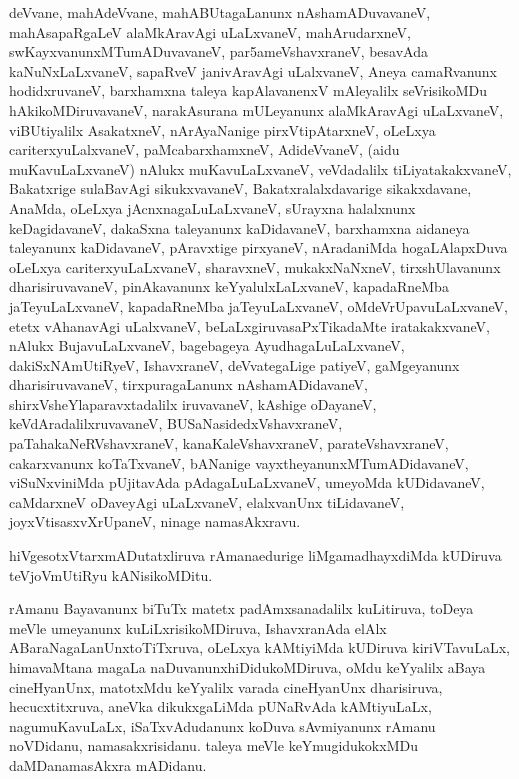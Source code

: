 \documentclass{article}
\begin{document}
\begin{mn}
deVvane,  mahAdeVvane,  mahABUtagaLanunx  nAshamADuvavaneV,  mahAsapaRgaLeV  alaMkAravAgi  uLaLxvaneV,  mahArudarxneV,  
swKayxvanunxMTumADuvavaneV,  par5ameVshavxraneV,  besavAda  kaNuNxLaLxvaneV,  sapaRveV  janivAravAgi  uLalxvaneV,  Aneya  
camaRvanunx  hodidxruvaneV,  barxhamxna  taleya  kapAlavanenxV  mAleyalilx  seVrisikoMDu  hAkikoMDiruvavaneV,  narakAsurana  
mULeyanunx  alaMkAravAgi  uLaLxvaneV,  viBUtiyalilx  AsakatxneV,  nArAyaNanige  pirxVtipAtarxneV,  oLeLxya  cariterxyuLalxvaneV,  
paMcabarxhamxneV,  AdideVvaneV,  (aidu  muKavuLaLxvaneV)  nAlukx  muKavuLaLxvaneV,  veVdadalilx  tiLiyatakakxvaneV,  Bakatxrige  
sulaBavAgi  sikukxvavaneV,  Bakatxralalxdavarige  sikakxdavane,  AnaMda,  oLeLxya  jAcnxnagaLuLaLxvaneV,  sUrayxna  halalxnunx  
keDagidavaneV,  dakaSxna  taleyanunx  kaDidavaneV,  barxhamxna  aidaneya  taleyanunx  kaDidavaneV,  pAravxtige  pirxyaneV,  
nAradaniMda  hogaLAlapxDuva  oLeLxya  cariterxyuLaLxvaneV,  sharavxneV,  mukakxNaNxneV,  tirxshUlavanunx  dharisiruvavaneV,  
pinAkavanunx  keYyalulxLaLxvaneV,  kapadaRneMba  jaTeyuLaLxvaneV,  kapadaRneMba  jaTeyuLaLxvaneV,  oMdeVrUpavuLaLxvaneV,  etetx  
vAhanavAgi  uLalxvaneV,  beLaLxgiruvasaPxTikadaMte  iratakakxvaneV,  nAlukx  BujavuLaLxvaneV,  bagebageya  AyudhagaLuLaLxvaneV,  
dakiSxNAmUtiRyeV,  IshavxraneV,  deVvategaLige  patiyeV,  gaMgeyanunx  dharisiruvavaneV,  tirxpuragaLanunx  nAshamADidavaneV,  
shirxVsheYlaparavxtadalilx  iruvavaneV,  kAshige  oDayaneV,  keVdAradalilxruvavaneV,  BUSaNasidedxVshavxraneV,  paTahakaNeRVshavxraneV,  
kanaKaleVshavxraneV,  parateVshavxraneV,  cakarxvanunx  koTaTxvaneV,  bANanige  vayxtheyanunxMTumADidavaneV,  viSuNxviniMda  pUjitavAda  
pAdagaLuLaLxvaneV,  umeyoMda  kUDidavaneV,  caMdarxneV  oDaveyAgi  uLaLxvaneV,  elalxvanUnx  tiLidavaneV,  joyxVtisasxvXrUpaneV,  ninage  namasAkxravu.
\end{mn}

\begin{mn}
hiVgesotxVtarxmADutatxliruva  rAmanaedurige  liMgamadhayxdiMda  kUDiruva  teVjoVmUtiRyu  kANisikoMDitu.
\end{mn}

\begin{mn}
rAmanu  Bayavanunx  biTuTx  matetx  padAmxsanadalilx  kuLitiruva,  toDeya  meVle  umeyanunx  kuLiLxrisikoMDiruva,  IshavxranAda  
elAlx  ABaraNagaLanUnxtoTiTxruva,  oLeLxya  kAMtiyiMda  kUDiruva  kiriVTavuLaLx,  himavaMtana  magaLa  naDuvanunxhiDidukoMDiruva,  
oMdu  keYyalilx  aBaya  cineHyanUnx,  matotxMdu  keYyalilx  varada  cineHyanUnx  dharisiruva,  hecucxtitxruva,  aneVka  dikukxgaLiMda  
pUNaRvAda  kAMtiyuLaLx,  nagumuKavuLaLx,  iSaTxvAdudanunx  koDuva  sAvmiyanunx  rAmanu  noVDidanu,  namasakxrisidanu.  taleya  meVle  
keYmugidukokxMDu  daMDanamasAkxra  mADidanu. 
\end{mn}
\end{document}

